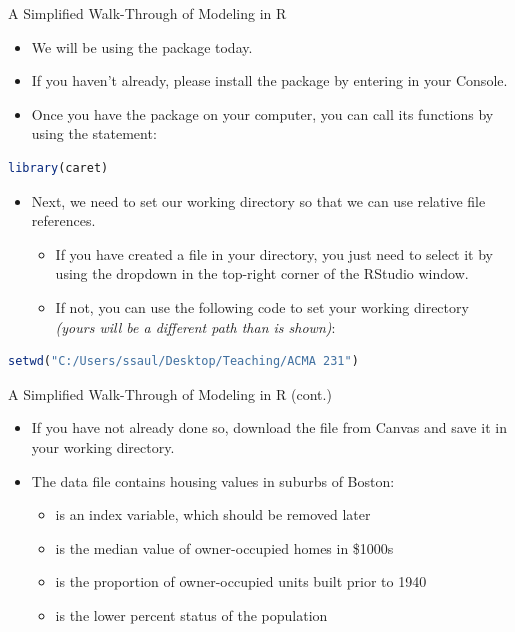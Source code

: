 \begin{frame}[fragile]{A Simplified Walk-Through of Modeling in R}
\begin{itemize}
  \item We will be using the  package today.
  \item If you haven’t already, please install the  package by entering  in your Console.
  \item Once you have the  package on your computer, you can call its functions by using the  statement:
\end{itemize}
\begin{lstlisting}[language=R]
library(caret)
\end{lstlisting}
\begin{itemize}
  \item Next, we need to set our working directory so that we can use relative file references.
  \begin{itemize}
    \item If you have created a  file in your directory, you just need to select it by using the dropdown in the top-right corner of the RStudio window.
    \item If not, you can use the following code to set your working directory \textit{(yours will be a different path than is shown)}:
  \end{itemize}
\end{itemize}
\begin{lstlisting}[language=R]
setwd("C:/Users/ssaul/Desktop/Teaching/ACMA 231")
\end{lstlisting}
\end{frame}

\begin{frame}{A Simplified Walk-Through of Modeling in R (cont.)}
\begin{itemize}
  \item If you have not already done so, download the  file from Canvas and save it in your working directory.
  \item The  data file contains housing values in suburbs of Boston:
  \begin{itemize}
    \item {} is an index variable, which should be removed later
    \item {} is the median value of owner-occupied homes in \$1000s
    \item {} is the proportion of owner-occupied units built prior to 1940
    \item {} is the lower percent status of the population
  \end{itemize}
\end{itemize}
\end{frame}

